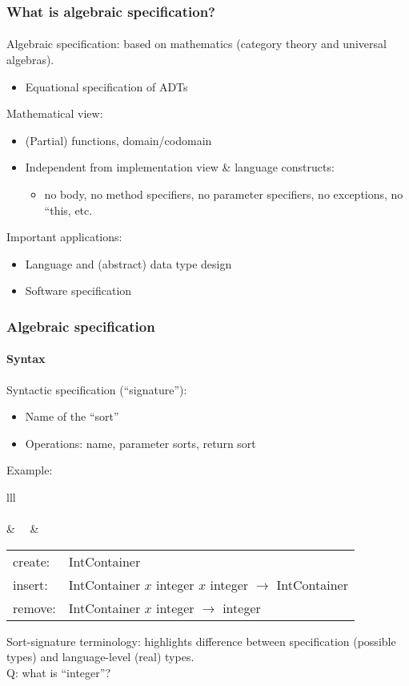 \documentclass{beamer}
\begin{document}
\begin{frame}[fragile]
\frametitle{What is algebraic specification?}
\framesubtitle{}
Algebraic specification: based on mathematics
(category theory and universal algebras). 
\begin{itemize}
\item Equational specification of ADTs
\end{itemize}
\bigskip

Mathematical view:
\begin{itemize}
\item (Partial) functions, domain/codomain
 \item Independent from implementation view \& language constructs:
\begin{itemize}
\item no body, no method specifiers, no parameter specifiers, no exceptions,
no ``this, etc. 
\end{itemize}
\end{itemize}

\bigskip
Important applications:
\begin{itemize}
\item Language and (abstract) data type design
\item Software specification
\end{itemize}
\end{frame}

\begin{frame}[fragile]
\frametitle{Algebraic specification}
\framesubtitle{Syntax}

Syntactic specification (``signature''):
\begin{itemize}
\item Name of the ``sort''
\item Operations: name, parameter sorts, return sort
\end{itemize}
\bigskip

Example:
\begin{tabular}{lll}
\\
\\
 & \ \ & 
   \begin{tabular}{ll}
   create:& IntContainer\\
   insert:& IntContainer $x$ integer $x$ integer $\rightarrow$  IntContainer\\
   remove:&  IntContainer $x$ integer $\rightarrow$  integer \\
   \end{tabular}
\end{tabular} 
\bigskip

Sort-signature terminology: highlights difference  between specification (possible
types) and language-level (real) types. \\
Q: what is ``integer''?
\end{frame}
\end{document}
